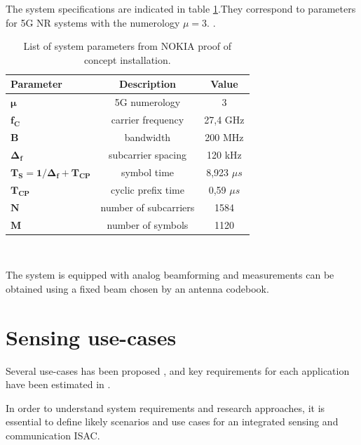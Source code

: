 	The system specifications are indicated in table \ref{table:PoCparams}.They correspond to parameters for 5G NR systems with the numerology $\mu=3$. \cite{TS138211}. 
	
	\begin{table}[H]
		\centering 
		\begin{tabular}{|p{9em} c c |}
			\hline
			\rowcolor{bluepoli!40} %
			\textbf{Parameter} & \textbf{Description} & \textbf{Value}  \T\B \\
			\hline \hline
			$\bm{\mu}$ & 5G numerology & 3 \T\B \\
			$\bm{f_C}$ & carrier frequency & 27,4 GHz \T\B \\
			$\bm{B}$ & bandwidth & 200 MHz \T\B\\
			$\bm{\Delta_f}$ & subcarrier spacing & 120 kHz  \T\B\\
			$\bm{T_S = 1/\Delta_f + T_{CP}}$ & symbol time & 8,923 $\mu s$  \T\B\\
			$\bm{T_{CP}}$ & cyclic prefix time & 0,59 $\mu s$  \T\B\\
			$\bm{N}$ & number of subcarriers & 1584  \T\B\\
			$\bm{M}$ & number of symbols & 1120  \B\\
			
			\hline
		\end{tabular}
		\\[10pt]
		\caption{List of system parameters from NOKIA proof of concept installation.}
		\label{table:PoCparams}
	\end{table}
	
	The system is equipped with analog beamforming and measurements can be obtained using a fixed beam chosen by an antenna codebook.


\section{Sensing use-cases}

	Several use-cases has been proposed \cite{Mandelli_Henninger_Bauhofer_Wild_2023}, \cite{Wang_Varshney_Gentile_Blandino_Chuang_Golmie_2022} and  key requirements for each application have been estimated in \cite{Wild_Braun_Viswanathan_2021}.
	
	In order to understand system requirements and research approaches, it is essential to define likely scenarios and use cases for an integrated sensing and communication ISAC.
	
